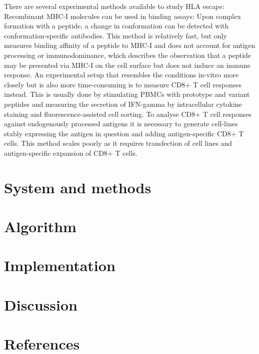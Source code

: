 \documentclass[fleqn,11pt]{SelfArx} %
\begin{document}
There are several experimental methods available to study HLA escape:
Recombinant MHC-I molecules can be used in binding assays: Upon complex formation
with a peptide, a change in conformation can be detected with conformation-specific
antibodies. This method is relatively fast, but only measures binding affinity of a
peptide to MHC-I and does not account for antigen processing or immunodominance, 
which describes the observation that a peptide may be presented via MHC-I on the cell surface but does
not induce an immune response.
An experimental setup that resembles the conditions in-vitro more closely but is also
more time-consuming is to measure
CD8+ T cell responses instead. This is usually done by stimulating PBMCs with prototype
and variant peptides and measuring the secretion of IFN-gamma by intracellular cytokine
staining and fluorescence-assisted cell sorting.
To analyse CD8+ T cell responses against endogenously processed antigens it is necessary
to generate cell-lines stably expressing the antigen in question and adding antigen-specific
CD8+ T cells. This method scales poorly as it requires transfection of cell lines and
antigen-specific expansion of CD8+ T cells.

\section{System and methods}
\section{Algorithm}
\section{Implementation}
\section{Discussion}
\section{References}

\thispagestyle{empty} %


\FloatBarrier



\end{document}
